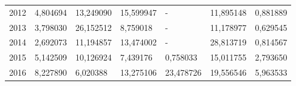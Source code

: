 \begin{table}
\begin{tabular}{p{1cm}p{2cm}p{2cm}p{2cm}p{2cm}p{2cm}p{2cm}}
 2012 &        4,804694 &                       13,249090 &            15,599947 &                             - &         11,895148 &   0,881889 \\
 2013 &        3,798030 &                       26,152512 &             8,759018 &                             - &         11,178977 &   0,629545 \\
 2014 &        2,692073 &                       11,194857 &            13,474002 &                             - &         28,813719 &   0,814567 \\
 2015 &        5,142509 &                       10,126924 &             7,439176 &                      0,758033 &         15,011755 &   2,793650 \\
 2016 &        8,227890 &                        6,020388 &            13,275106 &                     23,478726 &         19,556546 &   5,963533 \\
\bottomrule
\end{tabular}
\end{table}
